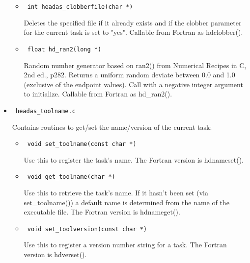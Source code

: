 \documentclass[11pt]{book}
\begin{document}
\begin{itemize}
\begin{itemize}
            \item      \begin{verbatim} int headas_clobberfile(char *) \end{verbatim} 
                  Deletes the specified file if it already exists
                  and if the clobber parameter for the current
                  task is set to "yes". Callable from Fortran as
                  hdclobber().

            \item      \begin{verbatim} float hd_ran2(long *) \end{verbatim} 
                  Random number generator based on ran2()
                  from Numerical Recipes in C, 2nd ed., p282.
                  Returns a uniform random deviate between
                  0.0 and 1.0 (exclusive of the endpoint values).
                  Call with a negative integer argument to
                  initialize. Callable from Fortran as
                  hd\_ran2().
            \end{itemize}

\item            \begin{verbatim} headas_toolname.c \end{verbatim}
            Contains routines to get/set the name/version of the
            current task:
            \begin{itemize}

            \item      \begin{verbatim} void set_toolname(const char *) \end{verbatim} 
                  Use this to register the task's name. The
                  Fortran version is hdnameset().

            \item      \begin{verbatim} void get_toolname(char *) \end{verbatim} 
                  Use this to retrieve the task's name. If it
                  hasn't been set (via set\_toolname()) a
                  default name is determined from the name of
                  the executable file. The Fortran version is
                  hdnameget().

            \item      \begin{verbatim} void set_toolversion(const char *) \end{verbatim} 
                  Use this to register a version number string
                  for a task. The Fortran version is
                  hdverset().


\end{itemize}
\end{itemize}
\end{document}
